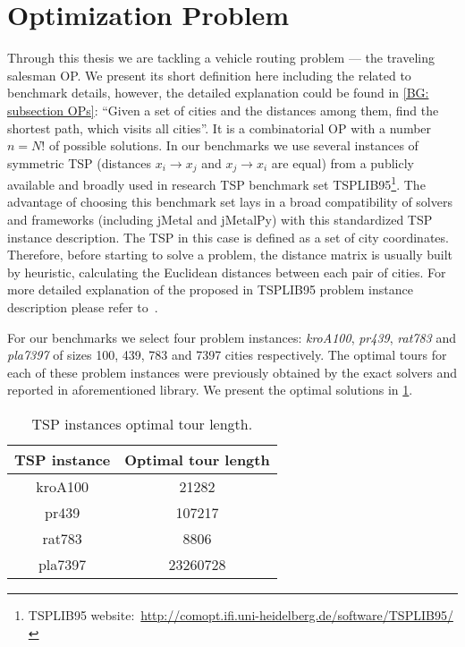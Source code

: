 \section{Optimization Problem}\label{eval: op}
Through this thesis we are tackling a vehicle routing problem --- the traveling salesman OP. We present its short definition here including the related to benchmark details, however, the detailed explanation could be found in \cref{BG: subsection OPs}: ``Given a set of cities and the distances among them, find the shortest path, which visits all cities''. It is a combinatorial OP with a number $n = N!$ of possible solutions. In our benchmarks we use several instances of symmetric TSP (distances $x_i \rightarrow x_j$ and $x_j \rightarrow x_i$ are equal) from a publicly available and broadly used in research TSP benchmark set TSPLIB95\footnote{TSPLIB95 website:~\url{http://comopt.ifi.uni-heidelberg.de/software/TSPLIB95/}}. The advantage of choosing this benchmark set lays in a broad compatibility of solvers and frameworks (including jMetal and jMetalPy) with this standardized TSP instance description. The TSP in this case is defined as a set of city coordinates. Therefore, before starting to solve a problem, the distance matrix is usually built by heuristic, calculating the Euclidean distances between each pair of cities. For more detailed explanation of the proposed in TSPLIB95 problem instance description please refer to~\cite{reinelt1995tsplib95}.

For our benchmarks we select four problem instances: \emph{kroA100}, \emph{pr439}, \emph{rat783} and \emph{pla7397} of sizes 100, 439, 783 and 7397 cities respectively. The optimal tours for each of these problem instances were previously obtained by the exact solvers and reported in aforementioned library. We present the optimal solutions in \cref{eval:table:tsp optimal tour length}.

\begin{table}[h!]
	\centering
	\begin{tabular}{cc}
		\rowcolor{gray!10}
		\hline
		\textbf{TSP instance} & \textbf{Optimal tour length} \\
		\hline
		kroA100 & 21282 \\
		pr439 & 107217 \\
		rat783 & 8806 \\
		pla7397 & 23260728 \\
		\hline
	\end{tabular}
	\caption{TSP instances optimal tour length.}
	\label{eval:table:tsp optimal tour length}
\end{table}



